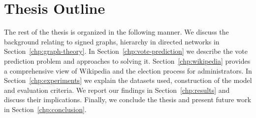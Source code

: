 \section{Thesis Outline}
The rest of the thesis is organized in the following manner. We discuss the background relating to signed graphs, hierarchy in directed networks in Section~\ref{chp:graph-theory}. In Section~\ref{chp:vote-prediction} we describe the vote prediction problem and approaches to solving it. Section~\ref{chp:wikipedia} provides a comprehensive view of Wikipedia and the election process for administrators. In Section~\ref{chp:experiments} we explain the datasets used, construction of the model and evaluation criteria. We report our findings in Section~\ref{chp:results} and discuss their implications. Finally, we conclude the thesis and present future work in Section~\ref{chp:conclusion}.